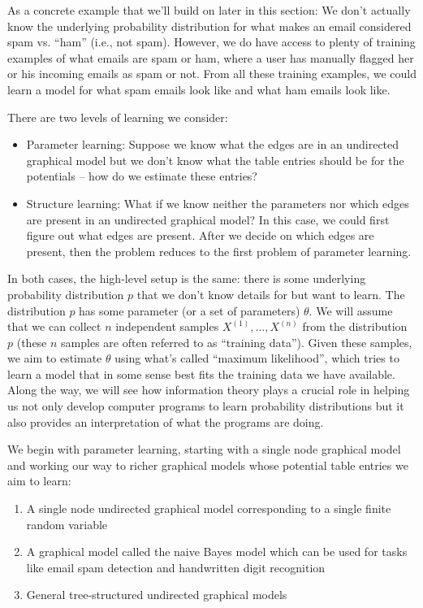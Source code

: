 \documentclass[6008notes.tex]{subfiles}
\begin{document}
As a concrete example that we'll build on later in this section: We don't actually know the underlying probability distribution for what makes an email considered spam vs. ``ham'' (i.e., not spam). However, we do have access to plenty of training examples of what emails are spam or ham, where a user has manually flagged her or his incoming emails as spam or not. From all these training examples, we could learn a model for what spam emails look like and what ham emails look like.

There are two levels of learning we consider:

\begin{itemize}
\item Parameter learning: Suppose we know what the edges are in an undirected graphical model but we don't know what the table entries should be for the potentials -- how do we estimate these entries?

\item Structure learning: What if we know neither the parameters nor which edges are present in an undirected graphical model? In this case, we could first figure out what edges are present. After we decide on which edges are present, then the problem reduces to the first problem of parameter learning.
\end{itemize}

In both cases, the high-level setup is the same: there is some underlying probability distribution $p$ that we don't know details for but want to learn. The distribution $p$ has some parameter (or a set of parameters) $\theta$. We will assume that we can collect $n$ independent samples $X^{(1)}, \dots , X^{(n)}$ from the distribution $p$ (these $n$ samples are often referred to as ``training data''). Given these samples, we aim to estimate $\theta$ using what's called ``maximum likelihood'', which tries to learn a model that in some sense best fits the training data we have available. Along the way, we will see how information theory plays a crucial role in helping us not only develop computer programs to learn probability distributions but it also provides an interpretation of what the programs are doing.

We begin with parameter learning, starting with a single node graphical model and working our way to richer graphical models whose potential table entries we aim to learn:

\begin{enumerate}
\item A single node undirected graphical model corresponding to a single finite random variable

\item A graphical model called the naive Bayes model which can be used for tasks like email spam detection and handwritten digit recognition

\item General tree-structured undirected graphical models
\end{enumerate}
\end{document}
